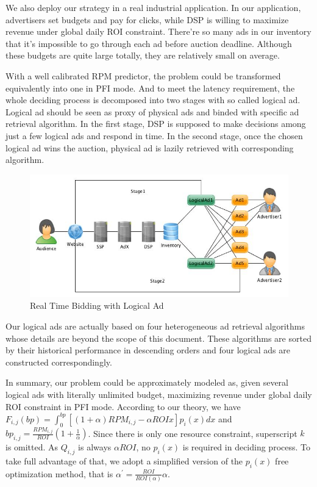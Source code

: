 \documentclass[sigconf]{acmart}
\newcommand{\sbp}{bp_{i,j}}
\newcommand{\sRPM}{RPM_{i,j}}
\newcommand{\sF}{F_{i,j}}
\newcommand{\dbbp}{\frac{\sRPM}{ROI}(1+\frac{1}{\alpha})}
\newcommand{\dbiter}{\alpha^{'} = \frac{ROI}{ROI(\alpha)}\alpha}
\begin{document}
We also deploy our strategy in a real industrial application.
In our application, advertisers set budgets and pay for clicks, while DSP is willing to maximize revenue under global daily ROI constraint.
There're so many ads in our inventory that it's impossible to go through each ad before auction deadline.
Although these budgets are quite large totally, they are relatively small on average.

With a well calibrated RPM predictor, the problem could be transformed equivalently into one in PFI mode.
And to meet the latency requirement, the whole deciding process is decomposed into two stages with so called logical ad.
Logical ad should be seen as proxy of physical ads and binded with specific ad retrieval algorithm.
In the first stage, DSP is supposed to make decisions among just a few logical ads and respond in time.
In the second stage, once the chosen logical ad wins the auction, physical ad is lazily retrieved with corresponding algorithm.

\begin{figure}[!h]
\centering
\includegraphics[width=1.0\linewidth]{./LogicalAd.jpg}
\caption{Real Time Bidding with Logical Ad}
\end{figure}

Our logical ads are actually based on four heterogeneous ad retrieval algorithms whose details are beyond the scope of this document.
These algorithms are sorted by their historical performance in descending orders and four logical ads are constructed correspondingly.

In summary, our problem could be approximately modeled as, given several logical ads with literally unlimited budget,
    maximizing revenue under global daily ROI constraint in PFI mode.
According to our theory, we have $\sF(bp) = \int_0^{bp} [(1+\alpha)\sRPM - \alpha{}ROIx]p_i(x)dx$ and $\sbp=\dbbp$.
Since there is only one resource constraint, superscript $k$ is omitted.
As $Q_{i,j}$ is always $\alpha{}ROI$, no $p_i(x)$ is required in deciding process.
To take full advantage of that, we adopt a simplified version of the $p_i(x)$ free optimization method, that is $\dbiter$.
\end{document}
